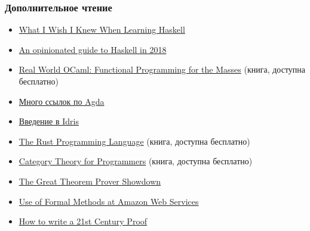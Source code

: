 \documentclass[11pt]{beamer}
\begin{document}
\begin{frame}[fragile]
\frametitle{Дополнительное чтение}
\begin{itemize}
    \item \href{http://dev.stephendiehl.com/hask/}{What I Wish I Knew When Learning Haskell}
    \item \href{https://lexi-lambda.github.io/blog/2018/02/10/an-opinionated-guide-to-haskell-in-2018/}{An opinionated guide to Haskell in 2018}
    \item \href{https://realworldocaml.org/}{Real World OCaml: Functional Programming for the Masses} (книга, доступна бесплатно)
    \item \href{https://wiki.portal.chalmers.se/agda/pmwiki.php?n=Main.Documentation}{Много ссылок по Agda}
    \item \href{http://docs.idris-lang.org/en/latest/tutorial/index.html}{Введение в Idris}
    \item \href{https://doc.rust-lang.org/1.30.0/book/2018-edition/index.html}{The Rust Programming Language} (книга, доступна бесплатно)
    \item \href{https://github.com/hmemcpy/milewski-ctfp-pdf}{Category Theory for Programmers} (книга, доступна бесплатно)
    \item \href{https://www.hillelwayne.com/post/theorem-prover-showdown/}{The Great Theorem Prover Showdown}
    \item \href{https://blog.acolyer.org/2014/11/24/use-of-formal-methods-at-amazon-web-services/}{Use of Formal Methods at Amazon Web Services}
    \item \href{https://blog.acolyer.org/2015/01/12/how-to-write-a-21st-century-proof/}{How to write a 21st Century Proof}
\end{itemize}
\end{frame}
\end{document}
